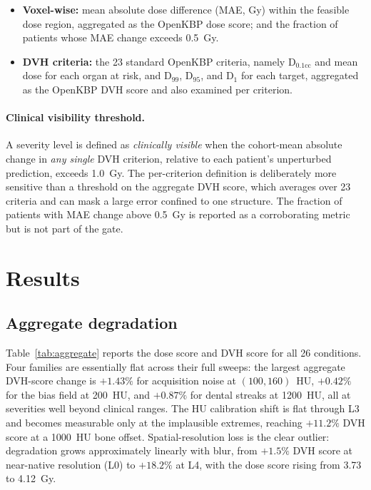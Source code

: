 \documentclass[11pt]{article}
\begin{document}
\begin{itemize}
\item \textbf{Voxel-wise:} mean absolute dose difference (MAE, Gy) within the
feasible dose region, aggregated as the OpenKBP dose score; and the fraction
of patients whose MAE change exceeds 0.5~Gy.
\item \textbf{DVH criteria:} the 23 standard OpenKBP criteria, namely
D$_{0.1\mathrm{cc}}$ and mean dose for each organ at risk, and D$_{99}$,
D$_{95}$, and D$_{1}$ for each target, aggregated as the OpenKBP DVH score
and also examined per criterion.
\end{itemize}

\paragraph{Clinical visibility threshold.} A severity level is defined as
\emph{clinically visible} when the cohort-mean absolute change in \emph{any
single} DVH criterion, relative to each patient's unperturbed prediction,
exceeds 1.0~Gy. The per-criterion definition is deliberately more sensitive
than a threshold on the aggregate DVH score, which averages over 23 criteria
and can mask a large error confined to one structure. The fraction of
patients with MAE change above 0.5~Gy is reported as a corroborating metric
but is not part of the gate.

\section{Results}

\subsection{Aggregate degradation}

Table~\ref{tab:aggregate} reports the dose score and DVH score for all 26
conditions. Four families are essentially flat across their full sweeps: the
largest aggregate DVH-score change is $+1.43\%$ for acquisition noise at
$(100, 160)$~HU, $+0.42\%$ for the bias field at 200~HU, and $+0.87\%$ for
dental streaks at 1200~HU, all at severities well beyond clinical ranges.
The HU calibration shift is flat through L3 and becomes measurable only at
the implausible extremes, reaching $+11.2\%$ DVH score at a 1000~HU bone
offset. Spatial-resolution loss is the clear outlier: degradation grows
approximately linearly with blur, from $+1.5\%$ DVH score at near-native
resolution (L0) to $+18.2\%$ at L4, with the dose score rising from 3.73 to
4.12~Gy.
\end{document}
